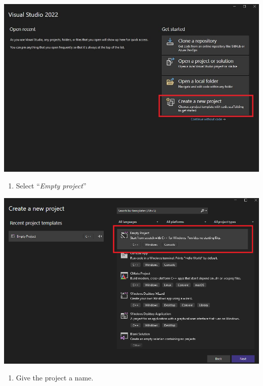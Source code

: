 \documentclass[../en-fa-lab.tex]{subfiles}
\begin{document}
\includegraphics[width=\textwidth]{../Resources/lab0/create_project1.png}

\begin{enumerate}
\def\labelenumi{\arabic{enumi}.}
\setcounter{enumi}{1}
\item
    Select ``\emph{Empty project}''
\end{enumerate}

\includegraphics[width=\textwidth]{../Resources/lab0/create_project2.png}

\begin{enumerate}
\def\labelenumi{\arabic{enumi}.}
\setcounter{enumi}{2}
\item
      Give the project a name.
\end{enumerate}
\end{document}
